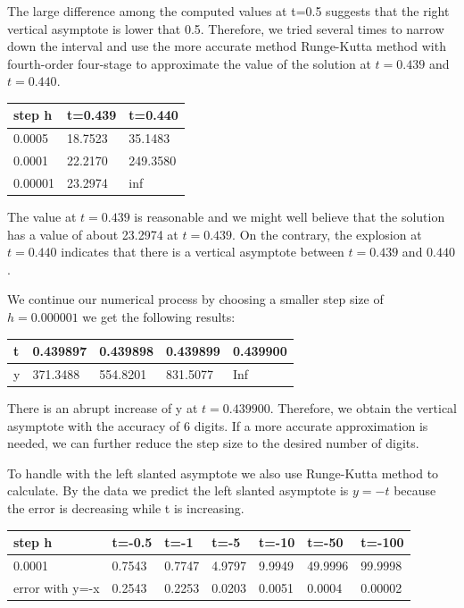 \documentclass[11pt,a4paper]{article}
\begin{document}
The large difference among the computed values at t=0.5 suggests that the right vertical asymptote is lower that 0.5. Therefore, we tried several times to narrow down the interval and use the more accurate method Runge-Kutta method with fourth-order four-stage to approximate the value of the solution at $t=0.439$ and $t=0.440$.

\begin{table}[H]
	\begin{center}
		\scriptsize
		\renewcommand{\arraystretch}{1.2}
		\begin{tabular}{l|l|l}
			step h  & t=0.439 & t=0.440  \\
			\hline
			0.0005  & 18.7523 & 35.1483  \\
			\hline
			0.0001  & 22.2170 & 249.3580 \\
			\hline
			0.00001 & 23.2974 & inf     
		\end{tabular}
	\end{center}
\end{table}

The value at $t=0.439$ is reasonable and we might well believe that the solution has a value of about 23.2974 at $t=0.439$. On the contrary, the explosion at $t=0.440$ indicates that there is a vertical asymptote between $t=0.439$ and $0.440$. 

We continue our numerical process by choosing a smaller step size of $h=0.000001$ we get the following results: 

\begin{table}[H]
	\centering
	\begin{tabular}{l|l|l|l|l}
	t & 0.439897 & 0.439898 & 0.439899 & 0.439900 \\
	\hline
	y & 371.3488 & 554.8201 & 831.5077 & Inf
	\end{tabular}
\end{table}

There is an abrupt increase of y at $t=0.439900$. Therefore, we obtain the vertical asymptote with the accuracy of 6 digits. If a more accurate approximation is needed, we can further reduce the step size to the desired number of digits. 

To handle with the left slanted asymptote we also use Runge-Kutta method to calculate. By the data we predict the left slanted asymptote is $y=-t$ because the error is decreasing while t is increasing.

\begin{table}[H]
	\centering
	\begin{tabular}{l|l|l|l|l|l|l}
		step h          & t=-0.5 & t=-1   & t=-5   & t=-10  & t=-50   & t=-100  \\ \hline
		0.0001          & 0.7543 & 0.7747 & 4.9797 & 9.9949 & 49.9996 & 99.9998 \\ \hline
		error with y=-x & 0.2543 & 0.2253 & 0.0203 & 0.0051 & 0.0004  & 0.00002
	\end{tabular}
\end{table}
\end{document}
